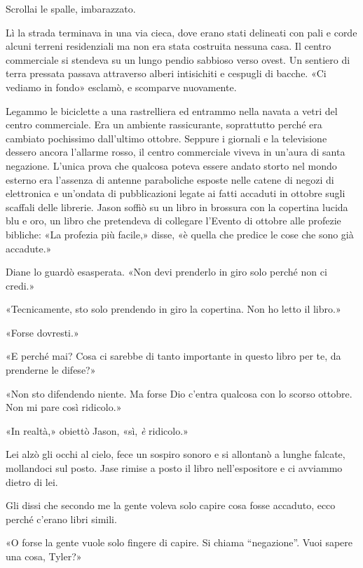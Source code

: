 Scrollai le spalle, imbarazzato.

Lì la strada terminava in una via cieca, dove erano stati delineati con
pali e corde alcuni terreni residenziali ma non era stata costruita
nessuna casa. Il centro commerciale si stendeva su un lungo pendio
sabbioso verso ovest. Un sentiero di terra pressata passava attraverso
alberi intisichiti e cespugli di bacche. «Ci vediamo in fondo» esclamò,
e scomparve nuovamente.

\separatorefiori

Legammo le biciclette a una rastrelliera ed entrammo nella navata a
vetri del centro commerciale. Era un ambiente rassicurante, soprattutto
perché era cambiato pochissimo dall'ultimo ottobre. Seppure i giornali e
la televisione dessero ancora l'allarme rosso, il centro commerciale
viveva in un'aura di santa negazione. L'unica prova che qualcosa poteva
essere andato storto nel mondo esterno era l'assenza di antenne
paraboliche esposte nelle catene di negozi di elettronica e un'ondata di
pubblicazioni legate ai fatti accaduti in ottobre sugli scaffali delle
librerie. Jason soffiò su un libro in brossura con la copertina lucida
blu e oro, un libro che pretendeva di collegare l'Evento di ottobre alle
profezie bibliche: «La profezia più facile,» disse, «è quella che
predice le cose che sono già accadute.»

Diane lo guardò esasperata. «Non devi prenderlo in giro solo perché non
ci credi.»

«Tecnicamente, sto solo prendendo in giro la copertina. Non ho letto il
libro.»

«Forse dovresti.»

«E perché mai? Cosa ci sarebbe di tanto importante in questo libro per
te, da prenderne le difese?»

«Non sto difendendo niente. Ma forse Dio c'entra qualcosa con lo scorso
ottobre. Non mi pare così ridicolo.»

«In realtà,» obiettò Jason, «sì, \emph{è} ridicolo.»

Lei alzò gli occhi al cielo, fece un sospiro sonoro e si allontanò a
lunghe falcate, mollandoci sul posto. Jase rimise a posto il libro
nell'espositore e ci avviammo dietro di lei.

Gli dissi che secondo me la gente voleva solo capire cosa fosse
accaduto, ecco perché c'erano libri simili.

«O forse la gente vuole solo fingere di capire. Si chiama ``negazione''.
Vuoi sapere una cosa, Tyler?»

